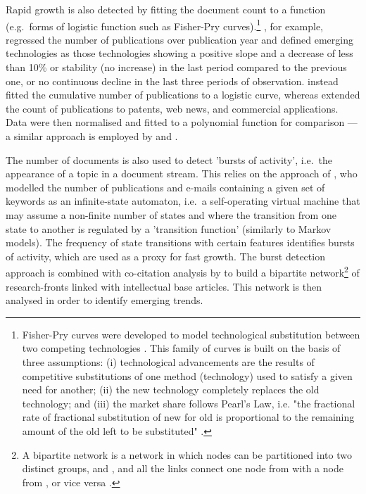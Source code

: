 \documentclass[11pt]{article}
\begin{document}
Rapid growth is also detected by fitting the document count to a function (e.g.\ forms of logistic function such as Fisher-Pry curves).\footnote{Fisher-Pry curves were developed to model technological substitution between two competing technologies \citep{Fisher1971}. This family of curves is built on the basis of three assumptions: (i) technological advancements are the results of competitive substitutions of one method (technology) used to satisfy a given need for another; (ii) the new technology completely replaces the old technology; and (iii) the market share follows Pearl's Law, i.e. "the fractional rate of fractional substitution of new for old is proportional to the remaining amount of the old left to be substituted" \citep[p. 75]{Fisher1971}.} \cite{Bengisu2003}, for example, regressed the number of publications over publication year and defined emerging technologies as those technologies showing a positive slope and a decrease of less than 10\% or stability (no increase) in the last period compared to the previous one, or no continuous decline in the last three periods of observation. \cite{Ho2014} instead fitted the cumulative number of publications to a logistic curve, whereas \cite{Abercrombie2012} extended the count of publications to patents, web news, and commercial applications. Data were then normalised and fitted to a polynomial function for comparison --- a similar approach is employed by \cite{Jarvenpaa2011} and \cite{Jun2014}. 

The number of documents is also used to detect 'bursts of activity', i.e.\ the appearance of a topic in a document stream. This relies on the approach of \cite{Kleinberg2002}, who modelled the number of publications and e-mails containing a given set of keywords as an infinite-state automaton, i.e.\ a self-operating virtual machine that may assume a non-finite number of states and where the transition from one state to another is regulated by a 'transition function' (similarly to Markov models). The frequency of state transitions with certain features identifies bursts of activity, which are used as a proxy for fast growth. The burst detection approach is combined with co-citation analysis by \cite{Chen2006} to build a bipartite network\footnote{A bipartite network is a network in which nodes can be partitioned into two distinct groups,  and , and all the links connect one node from  with a node from , or vice versa \citep{Wassermann1994}.} of research-fronts linked with intellectual base articles. This network is then analysed in order to identify emerging trends.
\end{document}
